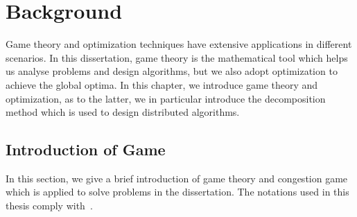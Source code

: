 \chapter{Background}
\label{background}
Game theory and optimization techniques have extensive applications in different scenarios.
In this dissertation, game theory is the mathematical tool which helps us analyse problems and design algorithms, but we also adopt optimization to achieve the global optima.
In this chapter, we introduce game theory and optimization, as to the latter, we in particular introduce the decomposition method which is used to design distributed algorithms.







 

\section{Introduction of Game}
In this section, we give a brief introduction of game theory and congestion game which is applied to solve problems in the dissertation.
The notations used in this thesis comply with~\cite{agt_book}.



